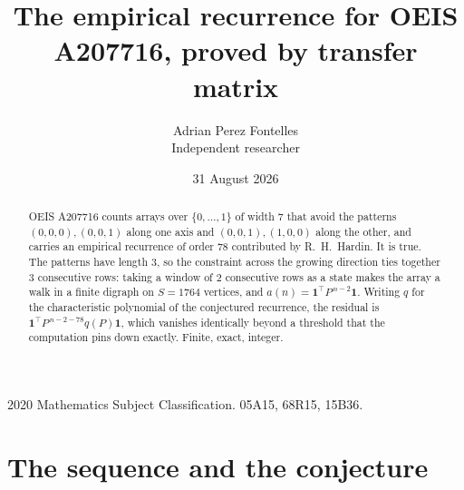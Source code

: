 \documentclass[11pt,a4paper]{article}
\title{The empirical recurrence for OEIS A207716, proved by transfer matrix}
\author{Adrian Perez Fontelles\\ \small Independent researcher}
\date{31 August 2026}
\theoremstyle{plain}
\theoremstyle{definition}
\begin{document}
\maketitle

\begin{abstract}
OEIS A207716 counts arrays over $\{0,\dots,1\}$ of width $7$ that avoid the patterns
$(0,0,0), (0,0,1)$ along one axis and $(0,0,1), (1,0,0)$ along the other, and carries an empirical recurrence of
order $78$ contributed by R.~H.~Hardin. It is true. The patterns have length $3$, so
the constraint across the growing direction ties together $3$ consecutive rows: taking a
window of $2$ consecutive rows as a state makes the array a walk in a finite digraph
on $S=1764$ vertices, and $a(n)=\mathbf{1}^{\!\top}P^{\,n-2}\mathbf{1}$. Writing $q$
for the characteristic polynomial of the conjectured recurrence, the residual is
$\mathbf{1}^{\!\top}P^{\,n-2-78}q(P)\mathbf{1}$, which vanishes identically
beyond a threshold that the computation pins down exactly. Finite, exact, integer.
\end{abstract}

\noindent\small 2020 Mathematics Subject Classification. 05A15, 68R15, 15B36.\normalsize

\section{The sequence and the conjecture}
\end{document}
